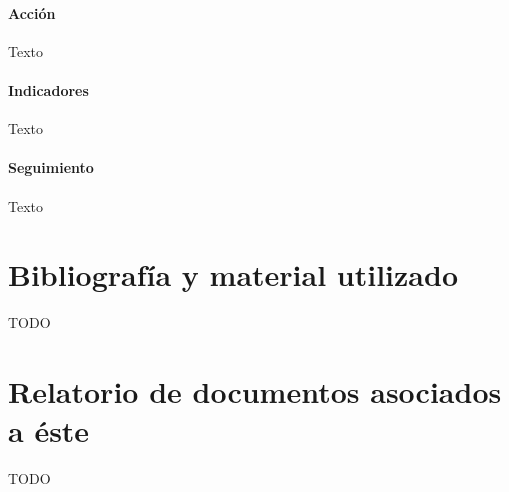 \documentclass[10pt,a4paper]{article}
\begin{document}
				\paragraph{Acción} Texto %
				\paragraph{Indicadores} Texto %
				\paragraph{Seguimiento}	Texto %

				
	\appendix
		\section{Bibliografía y material utilizado}
			TODO %
			
		\section{Relatorio de documentos asociados a éste}
			TODO %
\end{document}
